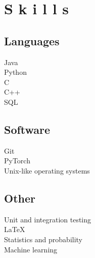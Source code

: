 \documentclass[]{deedy-resume-openfont}
\begin{document}
\begin{minipage}[t]{0.33\textwidth}

\section{S k i l l s}

\subsection{Languages}
\textbullet{} Java \\
\textbullet{} Python \\
\textbullet{} C \\
\textbullet{} C++ \\
\textbullet{} SQL \\

\subsection{Software}
\textbullet{} Git \\
\textbullet{} PyTorch \\
\textbullet{} Unix-like operating systems \\

\subsection{Other}
\textbullet{} Unit and integration testing \\
\textbullet{} \LaTeX\ \\ 
\textbullet{} Statistics and probability \\
\textbullet{} Machine learning
\sectionsep

%
%

\end{minipage} 
\hfill
\end{document}

